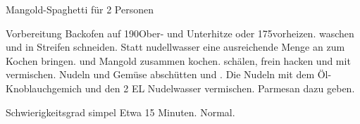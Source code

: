 \begin{recipe}{Mangold-Spaghetti für 2 Personen}
	\item[Vorbereitung] Backofen auf 190\textcelsius Ober- und Unterhitze oder 175\textcelsius vorheizen.
	 waschen und in Streifen schneiden. Statt nudellwasser eine ausreichende Menge an 
	 zum Kochen bringen. 
	 und Mangold zusammen kochen.
	 schälen, frein hacken und mit
	 vermischen. Nudeln und Gemüse abschütten und 
	. Die Nudeln mit dem Öl-Knoblauchgemich und den 2 EL Nudelwasser vermischen. Parmesan dazu geben.
	\item{Schwierigkeitsgrad} simpel
	\preparationtime Etwa 15 Minuten.
	\washingup Normal.
\end{recipe}